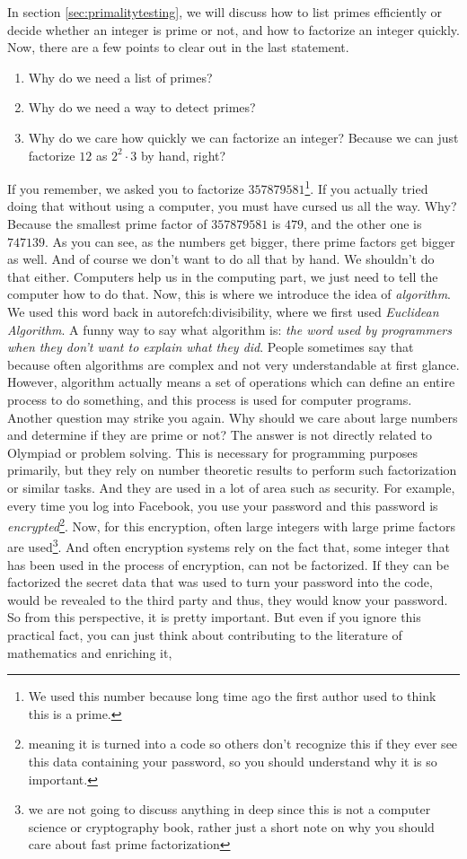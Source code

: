 In section \eqref{sec:primalitytesting}, we will discuss how to list primes efficiently or decide whether an integer is prime or not, and how to factorize an integer quickly. Now, there are a few points to clear out in the last statement.
	\begin{enumerate}
		\item Why do we need a list of primes?
		\item Why do we need a way to detect primes?
		\item Why do we care how quickly we can factorize an integer? Because we can just factorize $12$ as $2^2\cdot3$ by hand, right?
	\end{enumerate}
If you remember, we asked you to factorize $357879581$\footnote{We used this number because long time ago the first author used to think this is a prime.}. If you actually tried doing that without using a computer, you must have cursed us all the way. Why? Because the smallest prime factor of $357879581$ is $479$, and the other one is $747139$. As you can see, as the numbers get bigger, there prime factors get bigger as well. And of course we don't want to do all that by hand. We shouldn't do that either. Computers help us in the computing part, we just need to tell the computer how to do that. Now, this is where we introduce the idea of \textit{algorithm}. We used this word back in autoref{ch:divisibility}, where we first used \textit{Euclidean Algorithm}. A funny way to say what algorithm is: \textit{the word used by programmers when they don't want to explain what they did}. People sometimes say that because often algorithms are complex and not very understandable at first glance. However, algorithm actually means a set of operations which can define an entire process to do something, and this process is used for computer programs. Another question may strike you again. Why should we care about large numbers and determine if they are prime or not? The answer is not directly related to Olympiad or problem solving. This is necessary for programming purposes primarily, but they rely on number theoretic results to perform such factorization or similar tasks. And they are used in a lot of area such as security. For example, every time you log into Facebook, you use your password and this password is \textit{encrypted}\footnote{meaning it is turned into a code so others don't recognize this if they ever see this data containing your password, so you should understand why it is so important.}. Now, for this encryption, often large integers with large prime factors are used\footnote{we are not going to discuss anything in deep since this is not a computer science or cryptography book, rather just a short note on why you should care about fast prime factorization}. And often encryption systems rely on the fact that, some integer that has been used in the process of encryption, can not be factorized. If they can be factorized the secret data that was used to turn your password into the code, would be revealed to the third party and thus, they would know your password. So from this perspective, it is pretty important. But even if you ignore this practical fact, you can just think about contributing to the literature of mathematics and enriching it, 